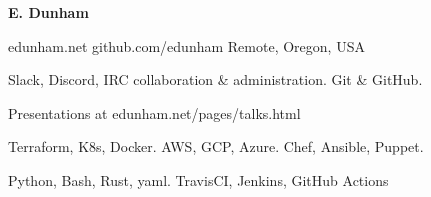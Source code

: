 \documentclass[11pt]{article} %
\begin{document}
\centerline{{\Huge \bf E. Dunham}}

\bigskip

        {edunham.net}
        {github.com/edunham}
        {Remote, Oregon, USA}


    {Slack, Discord, IRC collaboration \& administration. Git \& GitHub.}

    {Presentations at edunham.net/pages/talks.html}


    {Terraform, K8s, Docker. AWS, GCP, Azure. Chef, Ansible, Puppet.}

    {Python, Bash, Rust, yaml. TravisCI, Jenkins, GitHub Actions}




\end{document}
